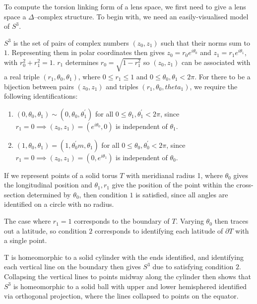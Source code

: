 \documentclass{article}
\begin{document}
To compute the torsion linking form of a lens space, we first need to give a lens space a $\Delta$--complex structure. To begin with, we need an easily-visualised model of $S^3$.

$S^3$ is the set of pairs of complex numbers $(z_0,z_1)$ such that their norms sum to $1$. Representing them in polar coordinates then gives $z_0=r_0e^{i\theta_0}$ and $z_1=r_1e^{i\theta_1}$, with $r_0^2+r_1^2=1$. $r_1$ determines $r_0=\sqrt{1-r_1^2}$ so $(z_0,z_1)$ can be associated with a real triple $(r_1,\theta_0,\theta_1)$, where $0\leq r_1\leq 1$ and $0\leq\theta_0,\theta_1<2\pi$.
For there to be a bijection between pairs $(z_0,z_1)$ and triples $(r_1,\theta_0,theta_1)$, we require the following identifications:
\begin{enumerate}
\item $(0,\theta_0,\theta_1)\sim(0,\theta_0,\theta_1^{'})$ for all $0\leq\theta_1,\theta_1^{'}<2\pi$, since $r_1=0\implies (z_0,z_1)=(e^{i\theta_0},0)$ is independent of $\theta_1$.
\item $(1,\theta_0,\theta_1)=(1,\theta_0^{'}m,\theta_1)$ for all $0\leq\theta_0,\theta_0^{'}<2\pi$, since $r_1=0\implies (z_0,z_1)=(0,e^{i\theta_1})$ is independent of $\theta_0$.
\end{enumerate}

If we represent points of a solid torus $T$ with meridianal radius 1, where $\theta_0$ gives the longitudinal position and $\theta_1,r_1$ give the position of the point within the cross-section determined by $\theta_0$, then condition $1$ is satisfied, since all angles are identified on a circle with no radius.

The case where $r_1=1$ corresponds to the boundary of $T$. Varying $\theta_0$ then traces out a latitude, so condition $2$ corresponds to identifying each latitude of $\partial T$ with a single point.

T is homeomorphic to a solid cylinder with the ends identified, and identifying each vertical line on the boundary then gives $S^3$ due to satisfying condition $2$. Collapsing the vertical lines to points midway along the cylinder then shows that $S^3$ is homeomorphic to a solid ball with upper and lower hemisphered identified via orthogonal projection, where the lines collapsed to points on the equator.
\end{document}
